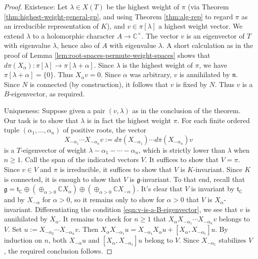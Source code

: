 \documentclass[reqno]{amsart} 
\begin{document}
\begin{proof}
  Existence: Let $\lambda \in X(T)$ be the highest weight of $\pi$ (via Theorem \ref{thm:highest-weight-general-gp}, and using Theorem \ref{thm:alg-rep} to regard $\pi$ as an irreducible representation of $K$), and $v \in \pi[\lambda]$ a highest weight vector.  We extend $\lambda$ to a holomorphic character $A \rightarrow \mathbb{C}^\times$.  The vector $v$ is an eigenvector of $T$ with eigenvalue $\lambda$, hence also of $A$ with eigenvalue $\lambda$.  A short calculation as in the proof of Lemma \ref{lem:root-spaces-permute-weight-spaces} shows that $d \pi(X_\alpha) : \pi[\lambda] \rightarrow \pi[\lambda+\alpha]$.  Since $\lambda$ is the highest weight of $\pi$, we have $\pi[\lambda+\alpha] = \{0\}$.  Thus $X_\alpha v = 0$.  Since $\alpha$ was arbitrary, $v$ is annihilated by $\mathfrak{n}$.  Since $N$ is connected (by construction), it follows that $v$ is fixed by $N$.  Thus $v$ is a $B$-eigenvector, as required.

  Uniqueness: Suppose given a pair $(v,\lambda)$ as in the conclusion of the theorem.  Our task is to show that $\lambda$ is in fact the highest weight $\pi$.  For each finite ordered tuple $(\alpha_1,\dotsc,\alpha_n)$ of positive roots, the vector
  \begin{equation}\label{eq:}
    X_{-\alpha_1} \dotsb X_{-\alpha_n} v
    :=
    d \pi(X_{-\alpha_1}) \dotsb d \pi(X_{-\alpha_n}) v
  \end{equation}
  is a $T$-eigenvector of weight $\lambda - \alpha_1 - \dotsb - \alpha_n$, which is strictly lower than $\lambda$ when $n \geq 1$.  Call the span of the indicated vectors $V$.  It suffices to show that $V = \pi$.  Since $v \in V$ and $\pi$ is irreducible, it suffices to show that $V$ is $K$-invariant.  Since $K$ is connected, it is enough to show that $V$ is $\mathfrak{g}$-invariant.  To that end, recall that $\mathfrak{g} = \mathfrak{t}_{\mathbb{C}} \oplus (\oplus_{\alpha >0} \mathbb{C} X_\alpha) \oplus (\oplus_{\alpha > 0} \mathbb{C} X_{-\alpha})$.  It's clear that $V$ is invariant by $\mathfrak{t}_{\mathbb{C}}$ and by $X_{-\alpha}$ for $\alpha > 0$, so it remains only to show for $\alpha > 0$ that $V$ is $X_{\alpha}$-invariant.  Differentiating the condition \eqref{eqn:v-is-a-B-eigenvector}, we see that $v$ is annihilated by $X_{\alpha}$.  It remains to check for $n \geq 1$ that $X_{\alpha} X_{-\alpha_1} \dotsb X_{-\alpha_n} v$ belongs to $V$.  Set $u := X_{-\alpha_2} \dotsb X_{-\alpha_n} v$.  Then $X_{\alpha} X_{-\alpha_1} u = X_{-\alpha_1} X_\alpha u + [X_{\alpha}, X_{-\alpha_1}] u$.  By induction on $n$, both $X_{-\alpha} u$ and $[X_{\alpha}, X_{-\alpha_1}] u$ belong to $V$.  Since $X_{-\alpha_1}$ stabilizes $V$, the required conclusion follows.
  

\end{proof}
\end{document}
